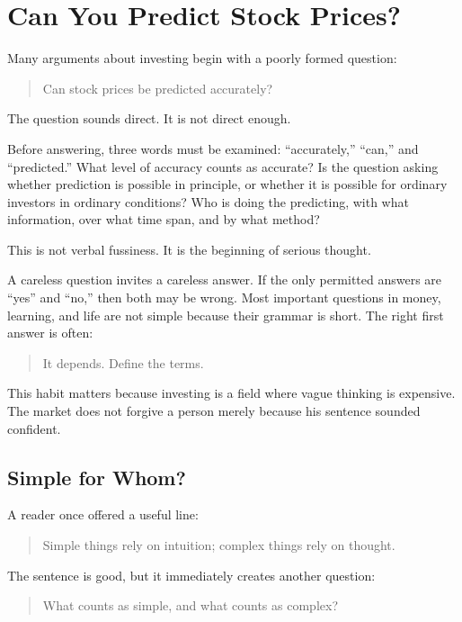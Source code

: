 \chapter{Can You Predict Stock Prices?}

Many arguments about investing begin with a poorly formed question:

\begin{quote}
Can stock prices be predicted accurately?
\end{quote}

The question sounds direct. It is not direct enough.

Before answering, three words must be examined: ``accurately,'' ``can,'' and ``predicted.'' What level of accuracy counts as accurate? Is the question asking whether prediction is possible in principle, or whether it is possible for ordinary investors in ordinary conditions? Who is doing the predicting, with what information, over what time span, and by what method?

This is not verbal fussiness. It is the beginning of serious thought.

A careless question invites a careless answer. If the only permitted answers are ``yes'' and ``no,'' then both may be wrong. Most important questions in money, learning, and life are not simple because their grammar is short. The right first answer is often:

\begin{quote}
It depends. Define the terms.
\end{quote}

This habit matters because investing is a field where vague thinking is expensive. The market does not forgive a person merely because his sentence sounded confident.

\section*{Simple for Whom?}

A reader once offered a useful line:

\begin{quote}
Simple things rely on intuition; complex things rely on thought.
\end{quote}

The sentence is good, but it immediately creates another question:

\begin{quote}
What counts as simple, and what counts as complex?
\end{quote}

